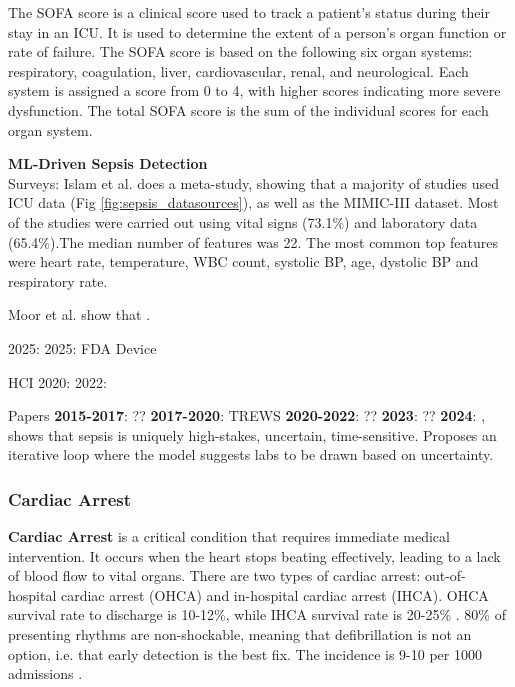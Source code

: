The SOFA score is a clinical score used to track a patient's status during their stay in an ICU. It is used to determine the extent of a person's organ function or rate of failure. The SOFA score is based on the following six organ systems: respiratory, coagulation, liver, cardiovascular, renal, and neurological. Each system is assigned a score from 0 to 4, with higher scores indicating more severe dysfunction. The total SOFA score is the sum of the individual scores for each organ system.

\textbf{ML-Driven Sepsis Detection} \\ 
Surveys: Islam et al. \cite{islam2023survey} does a meta-study, showing that a majority of studies used ICU data (Fig \ref{fig:sepsis_datasources}), as well as the MIMIC-III dataset. Most of the studies were carried out using vital signs (73.1\%) and laboratory data (65.4\%).The median number of features was 22. The most common top features were heart rate, temperature, WBC count, systolic BP, age, dystolic BP and respiratory rate.


Moor et al. \cite{moor2021survey} show that . 


2025: \cite{Bignami2025AISepsis}
2025: FDA Device \cite{bhargava2024ImmunoScore}

HCI
2020: \cite{sandhu2022integrating}
2022: \cite{silvestri2022desired}


Papers
\textbf{2015-2017}: ?? 
\textbf{2017-2020}: TREWS \cite{adams2022trews} 
\textbf{2020-2022}: ??
\textbf{2023}: ??
\textbf{2024}: \cite{optimizing_ai_sepsis_2024}, \cite{zhang2024chi} shows that sepsis is uniquely high-stakes, uncertain, time-sensitive. Proposes an iterative loop where the model suggests labs to be drawn based on uncertainty.




\subsubsection{Cardiac Arrest}
\label{sec:cardiac_arrest}
\textbf{Cardiac Arrest} is a critical condition that requires immediate medical intervention. It occurs when the heart stops beating effectively, leading to a lack of blood flow to vital organs.  There are two types of cardiac arrest: out-of-hospital cardiac arrest (OHCA) and in-hospital cardiac arrest (IHCA). OHCA survival rate to discharge is 10-12\%, while IHCA survival rate is 20-25\% \cite{andersen2019cardiac}. 80\% of presenting rhythms are non-shockable, meaning that defibrillation is not an option, i.e. that early detection is the best fix. The incidence is 9-10 per 1000 admissions \cite{andersen2019cardiac}.

